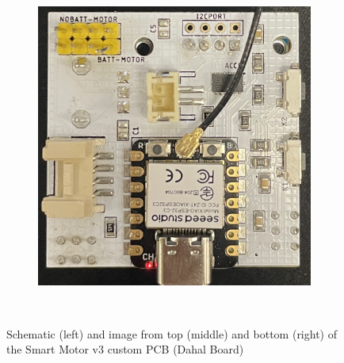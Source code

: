 \begin{figure}[H]
\begin{subfigure}[b]{0.25\textwidth}
    \end{subfigure}
    \hspace{10pt}
    \begin{subfigure}[b]{0.25\textwidth}
        \includegraphics[width=\linewidth]{overleaf/images/back.jpg}
    \end{subfigure}
    \\\vspace{\ftspace}
    \caption{Schematic (left) and image  from top (middle) and bottom (right) of the Smart Motor v3 custom PCB (Dahal Board)}
    \label{fig:sm_dahal_board}
\end{figure}

